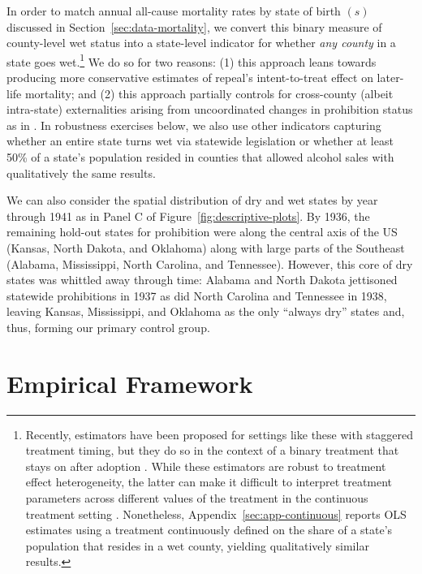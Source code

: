 \documentclass[12pt]{article}
\begin{document}
In order to match annual all-cause mortality rates by state of birth $(s)$ discussed in Section~\ref{sec:data-mortality}, we convert this binary measure of county-level wet status into a state-level indicator for whether \emph{any county} in a state goes wet.\footnote{Recently, estimators have been proposed for settings like these with staggered treatment timing, but they do so in the context of a binary treatment that stays on after adoption . 
While these estimators are robust to treatment effect heterogeneity, the latter can make it difficult to interpret treatment parameters across different values of the treatment in the continuous treatment setting . 
Nonetheless, Appendix~\ref{sec:app-continuous} reports OLS estimates using a treatment continuously defined on the share of a state's population that resides in a wet county, yielding qualitatively similar results.}
We do so for two reasons: (1) this approach leans towards producing more conservative estimates of repeal's intent-to-treat effect on later-life mortality; and (2) this approach partially controls for cross-county (albeit intra-state) externalities arising from uncoordinated changes in prohibition status as in . 
In robustness exercises below, we also use other indicators capturing whether an entire state turns wet via statewide legislation or whether at least 50\% of a state's population resided in counties that allowed alcohol sales with qualitatively the same results. 

We can also consider the spatial distribution of dry and wet states by year through 1941 as in Panel C of Figure~\ref{fig:descriptive-plots}. 
By 1936, the remaining hold-out states for prohibition were along the central axis of the US (Kansas, North Dakota, and Oklahoma) along with large parts of the Southeast (Alabama, Mississippi, North Carolina, and Tennessee). 
However, this core of dry states was whittled away through time: Alabama and North Dakota jettisoned statewide prohibitions in 1937 as did North Carolina and Tennessee in 1938, leaving Kansas, Mississippi, and Oklahoma as the only ``always dry'' states and, thus, forming our primary control group. 


\section{Empirical Framework} \label{sec:empirical-framework}
\end{document}

